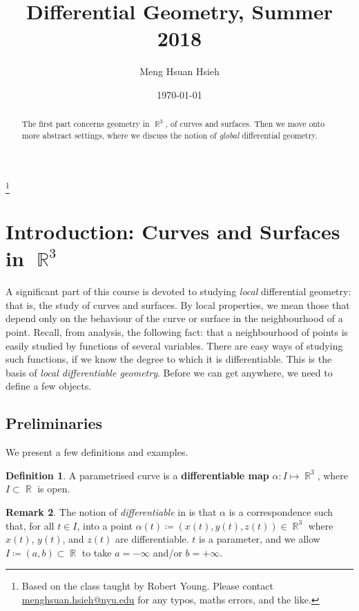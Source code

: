 \documentclass{amsart} %
\theoremstyle{mytheoremstyle}
\theoremstyle{definition}
\newtheorem{definition}{Definition}[section]
\newtheorem{remark}[definition]{Remark}
\numberwithin{equation}{section}
\DeclareMathOperator{\R}{\mathbb{R}}
\DeclareMathOperator{\1}{\mathbbm{1}}
\begin{document}
\title{Differential Geometry, Summer 2018}
\author{Meng Hsuan Hsieh}
\noindent \thanks{Based on the class taught by Robert Young. Please contact \url{menghsuan.hsieh@nyu.edu} for any typos, maths errors, and the like.}
\date{\today}
	
\sloppy
\maketitle

\begin{abstract}
	The first part concerns geometry in $\R^3$, of curves and surfaces. Then we move onto more abstract settings, where we discuss the notion of \textit{global} differential geometry.
\end{abstract}

{\hypersetup{linkcolor=black}
\tableofcontents}


\section{Introduction: Curves and Surfaces in $\R^3$}

A significant part of this course is devoted to studying \textit{local} differential geometry: that is, the study of curves and surfaces. By local properties, we mean those that depend only on the behaviour of the curve or surface in the neighbourhood of a point. Recall, from analysis, the following fact: that a neighbourhood of points is easily studied by functions of several variables. There are easy ways of studying such functions, if we know the degree to which it is differentiable. This is the basis of \textit{local differentiable geometry}. Before we can get anywhere, we need to define a few objects.


\subsection{Preliminaries}

We present a few definitions and examples.

\begin{definition}
	\label{defdifferentiablemap}
	A parametrised curve is a \textbf{differentiable map} $\alpha: I \mapsto \R^3$, where $I \subset \R$ is open.
\end{definition}

\begin{remark}
	The notion of \textit{differentiable} in  is that $\alpha$ is a correspondence such that, for all $t \in I$, into a point $\alpha(t) \coloneqq (x(t),y(t),z(t)) \in \R^3$ where $x(t)$, $y(t)$, and $z(t)$ are differentiable. $t$ is a parameter, and we allow $I  \coloneqq (a,b) \subset \R$ to take $a=-\infty$ and/or $b=+\infty$.
\end{remark}
\end{document}
